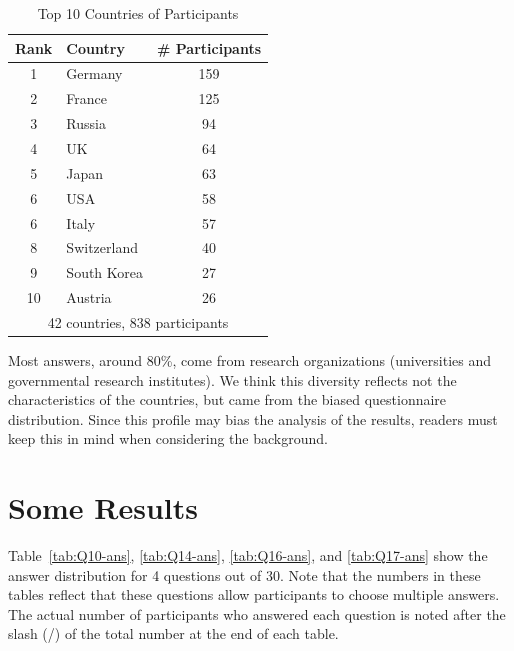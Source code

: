 \documentclass[sigconf,nonacm]{acmart}
\begin{document}
\begin{table}[htb]%
\begin{center}%
\caption{\small Top 10 Countries of Participants}
\vspace{-3mm}
\label{tab:countries}%
\begin{tabular}{c|l|c}%
\hline%
Rank & Country & \# Participants \\%
\hline%
1 & Germany 	& 159 \\%
2 & France 	& 125 \\%
3 & Russia 	& 94 \\%
4 & UK 		& 64 \\%
5 & Japan 	& 63 \\%
6 & USA 		& 58 \\%
6 & Italy 		& 57 \\%
\hline
8 & Switzerland & 40 \\%
9 & South Korea & 27 \\%
10 & Austria 	& 26  \\%
\hline%
\multicolumn{3}{c}{42 countries, 838 participants} \\%
\end{tabular}%
\end{center}%
\vspace{-5mm}
\end{table}%

Most answers, around 80\%, come from research organizations
(universities and governmental research institutes).  We think this
diversity reflects not the characteristics of the countries, but
came from the biased questionnaire distribution.
Since this profile may bias the analysis of the results,
readers must keep this in mind when considering the  background.

\section{Some Results}

Table~\ref{tab:Q10-ans}, \ref{tab:Q14-ans}, \ref{tab:Q16-ans}, and
\ref{tab:Q17-ans} show the answer distribution for 4 questions out of
30. Note that the numbers in these tables reflect that these questions allow participants to choose multiple answers. 
The actual number of participants who answered
each question is noted after the slash (/) of the total number
at the end of each table.
\end{document}
